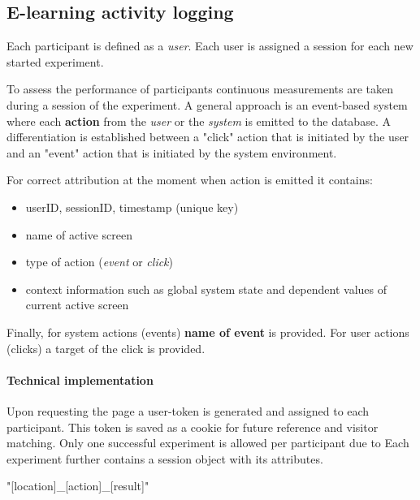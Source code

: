 	\subsection{E-learning activity logging} \label{sec:activitylog}
	
	Each participant is defined as a \textit{user}. Each user is assigned a session for each new started experiment. 
	
	To assess the performance of participants continuous measurements are taken during a session of the experiment. A general approach is an event-based system where each \textbf{action} from the \textit{user} or the \textit{system} is emitted to the database. A differentiation is established between a "click" action that is initiated by the user and an "event" action that is initiated by the system environment.
	
	For correct attribution at the moment when action is emitted it contains: 
	\begin{itemize}
		\item userID, sessionID, timestamp (unique key)
		\item name of active screen
		\item type of action (\textit{event} or \textit{click})
		\item context information such as global system state and dependent values of current active screen
	\end{itemize}

	Finally, for system actions (events) \textbf{name of event} is provided. For user actions (clicks) a target of the click is provided.
	

	

		
		\paragraph{Technical implementation}
		
		Upon requesting the page a user-token is generated and assigned to each participant. This token is saved as a cookie for future reference and visitor matching. Only one successful experiment is allowed per participant due to 
		Each experiment further contains a session object with its attributes. 
		
		"[location]\_[action]\_[result]"
		
